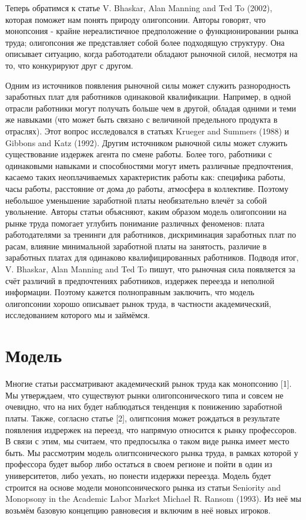 \documentclass[a4paper, 12pt]{article}
\theoremstyle{definition}
\theoremstyle{plain}
\begin{document}
	Теперь обратимся к статье V. Bhaskar, Alan Manning and Ted To (2002), которая поможет нам понять природу олигопсонии. Авторы говорят,  что монопсония - крайне нереалистичное предположение о функционировании рынка труда; олигопсония же представляет собой более подходящую структуру. Она описывает ситуацию, когда работодатели обладают рыночной силой, несмотря на то, что конкурируют друг с другом. 

	Одним из источников появления рыночной силы может служить разнородность заработных плат для работников одинаковой квалификации. Например, в одной отрасли работники могут получать больше чем в другой, обладая одними и теми же навыками (что может быть связано с величиной предельного продукта в отраслях). Этот вопрос исследовался в статьях Krueger and Summers (1988) и Gibbons and Katz (1992).
Другим источником рыночной силы может служить существование издержек агента по смене работы. Более того, работники с одинаковыми навыками и способностями могут иметь различные предпочтения, касаемо таких неоплачиваемых характеристик работы как: специфика работы, часы работы, расстояние от дома до работы, атмосфера в коллективе. Поэтому небольшое уменьшение заработной платы необязательно влечёт за собой увольнение.
Авторы статьи объясняют, каким образом модель олигопсонии на рынке труда помогает углубить понимание различных феноменов: плата работодателями за тренинги для работников, дискриминация заработных плат по расам, влияние минимальной заработной платы на занятость, различие в заработных платах для одинаково квалифицированных работников. Подводя итог, V. Bhaskar, Alan Manning and Ted To пишут, что рыночная сила появляется за счёт различий в предпочтениях работников, издержек переезда и неполной информации. Поэтому кажется полноправным заключить, что модель олигопсонии хорошо описывает рынок труда, в частности академический, исследованием которого мы и займёмся.

\section{Модель}

Многие статьи рассматривают академический рынок труда как монопсонию [1]. Мы утверждаем, что существуют рынки олигопсонического типа и совсем не очевидно, что на них будет наблюдаться тенденция к понижению заработной платы. Также, согласно статье [2], олигпсония может рождаться в результате появления издрержек на переезд, что напрямую относится к рынку профессоров. В связи с этим, мы считаем, что предпосылка о таком виде рынка имеет место быть.  Мы рассмотрим модель олигпсонического рынка труда, в рамках которой у профессора будет выбор либо остаться в своем регионе и пойти в один из университетов, либо уехать, но понести издержки переезда. Модель будет строится на основе модели монопсонического рынка из статьи Seniority and Monopsony in the Academic Labor Market Michael R. Ransom (1993). Из неё мы возьмём базовую концепцию равновесия и включим в неё новых игроков. 
\end{document}
